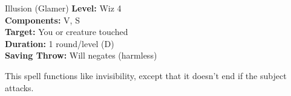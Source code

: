 {Illusion (Glamer)}
{
	\textbf{Level:}
	Wiz 4\\
	\textbf{Components:}
	V, S\\
	\textbf{Target:}
	You or creature touched\\
	\textbf{Duration:}
	1 round/level (D)\\
	\textbf{Saving Throw:}
	Will negates (harmless)\\
}
{
	This spell functions like invisibility, except that it doesn't end if the subject attacks.

}
